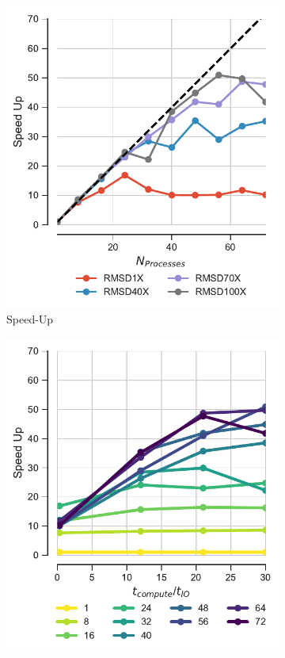 \begin{figure}[ht!]
\centering
\begin{subfigure} {.3\textwidth}
  \includegraphics[width=\linewidth]{figures/Compute_to_IO_ratio_on_performance_2d_v17.pdf}
  \caption{Speed-Up}
  \label{fig:S1_tcomp_tIO_effect}
\end{subfigure}
\hfill
\begin{subfigure}{.3\textwidth}
  \includegraphics[width=\linewidth]{figures/Compute_to_IO_ratio_on_performance_2d_2_v17.pdf}

\end{subfigure}
\end{figure}
